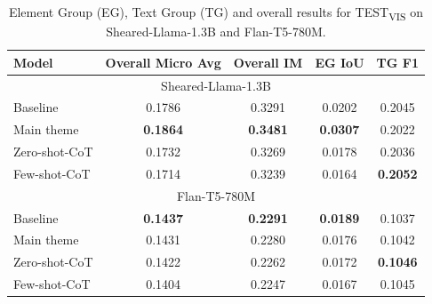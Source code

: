 \documentclass[11pt]{article}
\begin{document}
\begin{table}[h]
\centering
\caption{Element Group (EG), Text Group (TG) and overall results for TEST\textsubscript{VIS} on Sheared-Llama-1.3B and Flan-T5-780M.} \label{tab:table5}
\label{table:performance_test_vis}
\begin{tabular}{|l|c|c|c|c|}
\hline

\textbf{Model} & \textbf{Overall Micro Avg} & \textbf{Overall IM} & \textbf{EG IoU} & \textbf{TG F1} \\
\hline\multicolumn{5}{|c|}{Sheared-Llama-1.3B}\\
\hline
Baseline & 0.1786 & 0.3291 & 0.0202 & 0.2045 \\
\hline

Main theme & \textbf{0.1864} & \textbf{0.3481} & \textbf{0.0307} & 0.2022 \\
\hline
Zero-shot-CoT & 0.1732 & 0.3269 & 0.0178 & 0.2036 \\
\hline
Few-shot-CoT & 0.1714 & 0.3239 & 0.0164 & \textbf{0.2052} \\
\hline\multicolumn{5}{|c|}{Flan-T5-780M}\\
\hline
Baseline & \textbf{0.1437} & \textbf{0.2291} & \textbf{0.0189} & 0.1037 \\
\hline

Main theme & 0.1431 & 0.2280 & 0.0176 & 0.1042 \\
\hline
Zero-shot-CoT & 0.1422 & 0.2262 & 0.0172 & \textbf{0.1046} \\
\hline
Few-shot-CoT & 0.1404 & 0.2247 & 0.0167 & 0.1045 \\
\hline
\end{tabular}
\end{table}
\end{document}
